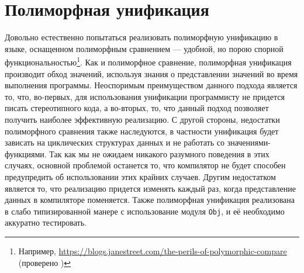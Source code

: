 
\section{Полиморфная унификация}
\label{sec:unification}

Довольно естественно попытаться реализовать полиморфную унификацию в языке, оснащенном полиморфным сравнением --- удобной, но порою спорной функциональностью\footnote{Например, \url{https://blogs.janestreet.com/the-perils-of-polymorphic-compare} (проверено )}.
Как и полиморфное сравнение, полиморфная унификация производит обход значений, используя знания о представлении значений во время выполнения программы.
Неоспоримым преимуществом данного подхода является то, что, во-первых, для использования унификации программисту не придется писать стереотипного %
кода, а во-вторых, то, что данный подход позволяет получить наиболее эффективную реализацию.
С другой стороны, недостатки полиморфного сравнения также наследуются, в частности унификация будет зависать на циклических структурах данных и не работать со значениями-функциями.
Так как мы не ожидаем никакого разумного поведения в этих случаях, основной проблемой останется то, что компилятор не будет способен предупредить об использовании этих крайних случаев.
Другим недостатком является то, что реализацию придется изменять каждый раз, когда представление данных в компиляторе поменяется.
Также полиморфная унификация реализована в слабо типизированной манере с использование модуля \lstinline|Obj|, и её необходимо аккуратно тестировать.


